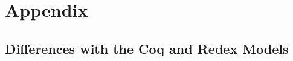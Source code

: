 \section{Appendix}

\subsection{Differences with the Coq and Redex Models}\label{app:model-diffs}


